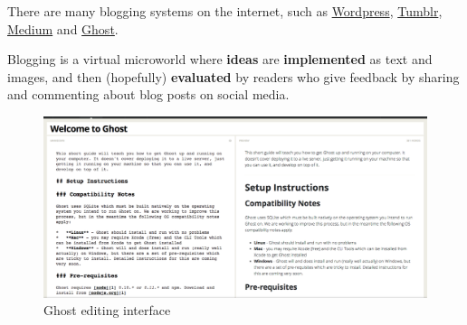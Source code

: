There are many blogging systems on the internet, such as \href{http://wordpress.org/}{Wordpress}, \href{http://tumblr.com}{Tumblr}, \href{http://medium.com}{Medium} and \href{http://ghost.org}{Ghost}. 

Blogging is a virtual microworld where \textbf{ideas} are \textbf{implemented} as text and images, and then (hopefully) \textbf{evaluated} by readers who give feedback by sharing and commenting about blog posts on social media. 

\begin{figure}[ht!]
\centering
\includegraphics[width=123mm]{img/ghost.png}
\caption{Ghost editing interface}
\label{overflow}
\end{figure}
